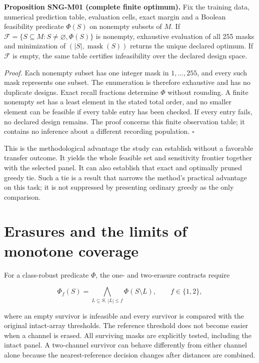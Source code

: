 \documentclass[
  11pt,
  a4paper,
]{report}
\begin{document}
\textbf{Proposition SNG-M01 (complete finite optimum).} Fix the training
data, numerical prediction table, evaluation cells, exact margin and a
Boolean feasibility predicate \(\Phi(S)\) on nonempty subsets of \(M\).
If \(\mathcal F=\{S\subseteq M:S\ne\varnothing,\Phi(S)\}\) is nonempty,
exhaustive evaluation of all 255 masks and minimization of
\((|S|,\operatorname{mask}(S))\) returns the unique declared optimum. If
\(\mathcal F\) is empty, the same table certifies infeasibility over the
declared design space.

\emph{Proof.} Each nonempty subset has one integer mask in
\(1,\ldots,255\), and every such mask represents one subset. The
enumeration is therefore exhaustive and has no duplicate designs. Exact
recall fractions determine \(\Phi\) without rounding. A finite nonempty
set has a least element in the stated total order, and no smaller
element can be feasible if every table entry has been checked. If every
entry fails, no declared design remains. The proof concerns this finite
observation table; it contains no inference about a different recording
population. \(\square\)

This is the methodological advantage the study can establish without a
favorable transfer outcome. It yields the whole feasible set and
sensitivity frontier together with the selected panel. It can also
establish that exact and optimally pruned greedy tie. Such a tie is a
result that narrows the method's practical advantage on this task; it is
not suppressed by presenting ordinary greedy as the only comparison.

\hypertarget{erasures-and-the-limits-of-monotone-coverage}{%
\section{Erasures and the limits of monotone
coverage}\label{erasures-and-the-limits-of-monotone-coverage}}

For a class-robust predicate \(\Phi\), the one- and two-erasure
contracts require

\[
\Phi_f(S)=\bigwedge_{L\subseteq S,\,|L|\le f}\Phi(S\setminus L),
\qquad f\in\{1,2\},
\]

where an empty survivor is infeasible and every survivor is compared
with the original intact-array thresholds. The reference threshold does
not become easier when a channel is erased. All surviving masks are
explicitly tested, including the intact panel. A two-channel survivor
can behave differently from either channel alone because the
nearest-reference decision changes after distances are combined.
\end{document}
